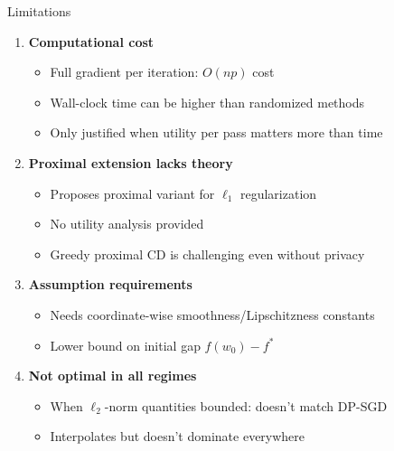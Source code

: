 \documentclass{beamer}
\begin{document}
\begin{frame}{Limitations}
\begin{enumerate}
\item \textbf{Computational cost}
\begin{itemize}
\item Full gradient per iteration: $O(np)$ cost
\item Wall-clock time can be higher than randomized methods
\item Only justified when utility per pass matters more than time
\end{itemize}

\item \textbf{Proximal extension lacks theory}
\begin{itemize}
\item Proposes proximal variant for $\ell_1$ regularization
\item No utility analysis provided
\item Greedy proximal CD is challenging even without privacy
\end{itemize}

\item \textbf{Assumption requirements}
\begin{itemize}
\item Needs coordinate-wise smoothness/Lipschitzness constants
\item Lower bound on initial gap $f(w_0) - f^*$
\end{itemize}

\item \textbf{Not optimal in all regimes}
\begin{itemize}
\item When $\ell_2$-norm quantities bounded: doesn't match DP-SGD
\item Interpolates but doesn't dominate everywhere
\end{itemize}
\end{enumerate}
\end{frame}
\end{document}
